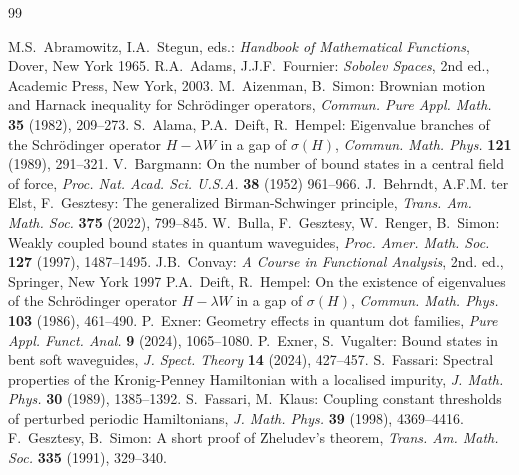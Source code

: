 \documentclass{article}
\numberwithin{equation}{section}
\theoremstyle{definition}
\begin{document}
\begin{thebibliography}{99}

M.S.~Abramowitz, I.A.~Stegun, eds.: \emph{Handbook of Mathematical Functions}, Dover, New York 1965.
R.A.~Adams, J.J.F.~Fournier: \emph{Sobolev Spaces}, 2nd ed., Academic Press, New York, 2003.
M.~Aizenman, B.~Simon: Brownian motion and Harnack inequality for Schr\"odinger operators, \emph{Commun. Pure Appl. Math.} \textbf{35} (1982), 209--273.
S.~Alama, P.A.~Deift, R.~Hempel: Eigenvalue branches of the Schr\"odinger operator $H-\lambda W$ in a gap of $\sigma(H)$, \emph{Commun. Math. Phys.} \textbf{121} (1989), 291--321.
V.~Bargmann: On the number of bound states in a central field of force, \emph{Proc. Nat. Acad. Sci. U.S.A.} \textbf{38} (1952)
961--966.
J.~Behrndt, A.F.M. ter Elst, F.~Gesztesy: The generalized Birman-Schwinger principle, \emph{Trans. Am. Math. Soc.} \textbf{375} (2022), 799--845.
W.~Bulla, F.~Gesztesy, W.~Renger, B.~Simon: Weakly coupled bound states in quantum waveguides, \emph{Proc. Amer. Math. Soc.} \textbf{127} (1997), 1487--1495.
J.B.~Convay: \emph{A Course in Functional Analysis}, 2nd. ed., Springer, New York 1997
P.A.~Deift, R.~Hempel: On the existence of eigenvalues of the Schr\"odinger operator $H-\lambda W$ in a gap of $\sigma(H)$, \emph{Commun. Math. Phys.} \textbf{103} (1986), 461--490.
P.~Exner: Geometry effects in quantum dot families, \emph{Pure Appl. Funct. Anal.} \textbf{9} (2024), 1065--1080.
P.~Exner, S.~Vugalter: Bound states in bent soft waveguides, \emph{J. Spect. Theory} \textbf{14} (2024), 427--457.
S.~Fassari: Spectral properties of the Kronig-Penney Hamiltonian with a localised impurity, \emph{J. Math. Phys.} \textbf{30} (1989), 1385--1392.
S.~Fassari, M.~Klaus: Coupling constant thresholds of perturbed periodic Hamiltonians, \emph{J. Math. Phys.} \textbf{39} (1998), 4369--4416.
F.~Gesztesy, B.~Simon: A short proof of Zheludev's theorem, \emph{Trans. Am. Math. Soc.} \textbf{335} (1991), 329--340.

\end{thebibliography}
\end{document}

